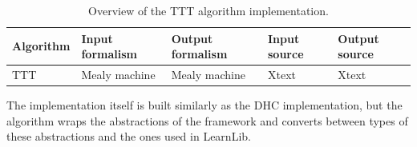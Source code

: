 \renewcommand{\tabularxcolumn}[1]{m{#1}}
\begin{table}[H]
	
	\begin{tabularx}{\columnwidth}{YYYYY}
		\hline
		\textbf{Algorithm} & \textbf{Input formalism} & \textbf{Output formalism} & \textbf{Input source} & \textbf{Output source}\\ \hline
		TTT & Mealy machine & Mealy machine & Xtext & Xtext \\	\hline
	\end{tabularx}
	\caption{Overview of the TTT algorithm implementation.}
	\label{tab:TTTformalisms}
\end{table}

The implementation itself is built similarly as the DHC implementation, but the algorithm wraps the abstractions of the framework and converts between types of these abstractions and the ones used in LearnLib.
